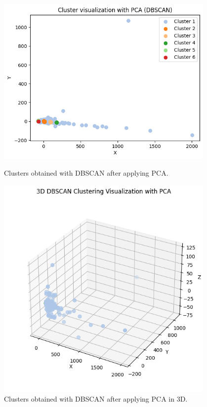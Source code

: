 \begin{figure}[H]
	\centering
	\begin{minipage}[t]{0.48\textwidth}
		\centering
		\includegraphics[width=0.95\textwidth]{../imgs/graphs/clustering/dbscan_pca.png}
		\caption{Clusters obtained with DBSCAN after applying PCA.}
		\label{fig:clusters_dbscan_pca}
	\end{minipage}\hfill
	\begin{minipage}[t]{0.48\textwidth}
		\centering
		\includegraphics[width=0.95\textwidth]{../imgs/graphs/clustering/dbscan_pca_3d.png}
		\caption{Clusters obtained with DBSCAN after applying PCA in 3D.}
		\label{fig:clusters_dbscan_pca_3d}
	\end{minipage}
\end{figure}


